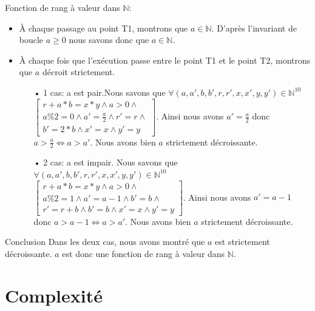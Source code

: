 \documentclass[12pt,a4paper]{report}
\begin{document}
\begin{flushleft}
Fonction de rang à valeur dans $\mathbb{N}$:
\begin{itemize}
\item \`A chaque passage au point T1, montrons que $a \in \mathbb{N}$. D'après l'invariant de boucle $a \ge 0$ nous savons donc que $a \in \mathbb{N}$.
\item \`A chaque fois que l'exécution passe entre le point T1 et le point T2, montrons que $a$ décroit strictement.
\begin{itemize}
\item[•] 1 cas: a est pair.Nous savons que $\forall(a,a',b,b',r,r',x,x',y,y')\in \mathbb{N}^{10}$ $\left[ \begin{array}{c} r + a*b = x*y\wedge a>0\wedge \\
a\%2=0\wedge a'= \frac{a}{2} \wedge r'=r \wedge\\
b'=2*b\wedge x'=x \wedge y'=y\end{array}
\right]$. Ainsi nous avons $a'=\frac{a}{2}$ donc $a>\frac{a}{2} \Leftrightarrow a>a'$. Nous avons bien $a$ strictement décroissante.
\item[•] 2 cas: a est impair. Nous savons que $\forall(a,a',b,b',r,r',x,x',y,y')\in \mathbb{N}^{10}$ $\left[ \begin{array}{c} r + a*b = x*y\wedge a>0\wedge \\
a\%2=1\wedge a'= a-1\wedge b'=b \wedge\\
r'=r+b\wedge b'=b\wedge x'=x \wedge y'=y\end{array}
\right]$. Ainsi nous avons $a'=a-1$ donc $a>a-1 \Leftrightarrow a>a'$. Nous avons bien $a$ strictement décroissante.
\end{itemize}
\end{itemize}
\begin{Cas1}{Conclusion}
 Dans les deux cas, nous avons montré que $a$ est strictement décroissante. $a$ est donc une fonction de rang à valeur dans $\mathbb{N}$.
\end{Cas1}
\end{flushleft}

\chapter{Complexité}
\end{document}
